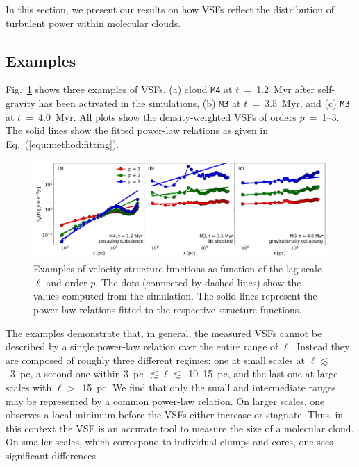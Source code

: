\documentclass{aa}		%
\begin{document}
In this section, we present our results on how VSFs reflect the distribution of turbulent power within molecular clouds.

\subsection{Examples}\label{results:example}

Fig.~\ref{pic:results:vsf_example} shows three examples of VSFs, (a) cloud \texttt{M4} at $t$~=~1.2~Myr after self-gravity has been activated in the simulations, (b) \texttt{M3} at $t$~=~3.5~Myr, and (c) \texttt{M3} at $t$~=~4.0~Myr.
All plots show the density-weighted VSFs of orders $p$~=~1--3.
The solid lines show the fitted power-law relations as given in Eq.~(\ref{equ:method:fitting}).

\begin{figure}[!htb]
	\centering
	\includegraphics[width=\textwidth]{vsf_example.pdf}
	\caption{Examples of velocity structure functions as function of the lag scale $\ell$ and order $p$. 
		The dots (connected by dashed lines) show the values computed from the simulation.
		The solid lines represent the power-law relations fitted to the respective structure functions.
	}
	\label{pic:results:vsf_example}
\end{figure}

The examples demonstrate that, in general, the measured VSFs cannot be described by a single power-law relation over the entire range of $\ell$.
Instead they are composed of roughly three different regimes: 
one at small scales at $\ell \lesssim$~3~pc, a second one within 3~pc~$\lesssim \ell \lesssim$~10--15~pc, and the last one at large scales with $\ell >$~15~pc.
We find that only the small and intermediate ranges may be represented by a common power-law relation.
On larger scales, one observes a local minimum before the VSFs either increase or stagnate.
Thus, in this context the VSF is an accurate tool to measure the size of a molecular cloud.
On smaller scales, which correspond to individual clumps and cores, one sees significant differences.
\end{document}
